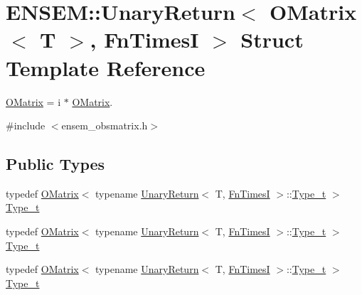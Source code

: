 \hypertarget{structENSEM_1_1UnaryReturn_3_01OMatrix_3_01T_01_4_00_01FnTimesI_01_4}{}\section{E\+N\+S\+EM\+:\+:Unary\+Return$<$ O\+Matrix$<$ T $>$, Fn\+TimesI $>$ Struct Template Reference}
\label{structENSEM_1_1UnaryReturn_3_01OMatrix_3_01T_01_4_00_01FnTimesI_01_4}


\mbox{\hyperlink{classENSEM_1_1OMatrix}{O\+Matrix}} = i $\ast$ \mbox{\hyperlink{classENSEM_1_1OMatrix}{O\+Matrix}}.  




{\ttfamily \#include $<$ensem\+\_\+obsmatrix.\+h$>$}

\subsection*{Public Types}
\begin{DoxyCompactItemize}
\item 
typedef \mbox{\hyperlink{classENSEM_1_1OMatrix}{O\+Matrix}}$<$ typename \mbox{\hyperlink{structENSEM_1_1UnaryReturn}{Unary\+Return}}$<$ T, \mbox{\hyperlink{structENSEM_1_1FnTimesI}{Fn\+TimesI}} $>$\+::\mbox{\hyperlink{structENSEM_1_1UnaryReturn_3_01OMatrix_3_01T_01_4_00_01FnTimesI_01_4_a823208991719b80307ceb78f0448f0de}{Type\+\_\+t}} $>$ \mbox{\hyperlink{structENSEM_1_1UnaryReturn_3_01OMatrix_3_01T_01_4_00_01FnTimesI_01_4_a823208991719b80307ceb78f0448f0de}{Type\+\_\+t}}
\item 
typedef \mbox{\hyperlink{classENSEM_1_1OMatrix}{O\+Matrix}}$<$ typename \mbox{\hyperlink{structENSEM_1_1UnaryReturn}{Unary\+Return}}$<$ T, \mbox{\hyperlink{structENSEM_1_1FnTimesI}{Fn\+TimesI}} $>$\+::\mbox{\hyperlink{structENSEM_1_1UnaryReturn_3_01OMatrix_3_01T_01_4_00_01FnTimesI_01_4_a823208991719b80307ceb78f0448f0de}{Type\+\_\+t}} $>$ \mbox{\hyperlink{structENSEM_1_1UnaryReturn_3_01OMatrix_3_01T_01_4_00_01FnTimesI_01_4_a823208991719b80307ceb78f0448f0de}{Type\+\_\+t}}
\item 
typedef \mbox{\hyperlink{classENSEM_1_1OMatrix}{O\+Matrix}}$<$ typename \mbox{\hyperlink{structENSEM_1_1UnaryReturn}{Unary\+Return}}$<$ T, \mbox{\hyperlink{structENSEM_1_1FnTimesI}{Fn\+TimesI}} $>$\+::\mbox{\hyperlink{structENSEM_1_1UnaryReturn_3_01OMatrix_3_01T_01_4_00_01FnTimesI_01_4_a823208991719b80307ceb78f0448f0de}{Type\+\_\+t}} $>$ \mbox{\hyperlink{structENSEM_1_1UnaryReturn_3_01OMatrix_3_01T_01_4_00_01FnTimesI_01_4_a823208991719b80307ceb78f0448f0de}{Type\+\_\+t}}
\end{DoxyCompactItemize}


